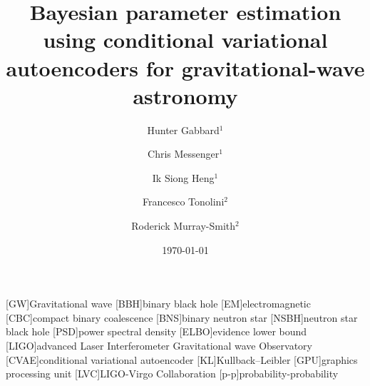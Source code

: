 \documentclass[%
showpacs,
 amsmath,amssymb,
 aps,
 twocolumn,
 prl,
 reprint,
floatfix,
]{revtex4-1}
\begin{document}

\title{Bayesian parameter estimation using conditional variational autoencoders
for gravitational-wave astronomy}

\author{Hunter Gabbard$^1$}
\author{Chris Messenger$^1$}
\author{Ik Siong Heng$^1$}
\author{Francesco Tonolini$^2$}
\author{Roderick Murray-Smith$^2$}


\date{\today}

\maketitle

%

[GW]{Gravitational wave}
[BBH]{binary black hole}
[EM]{electromagnetic}
[CBC]{compact binary coalescence}
[BNS]{binary neutron star}
[NSBH]{neutron star black hole}
[PSD]{power spectral density}
[ELBO]{evidence lower bound}
[LIGO]{advanced Laser Interferometer Gravitational wave Observatory}
[CVAE]{conditional variational autoencoder}
[KL]{Kullback--Leibler}
[GPU]{graphics processing unit}
[LVC]{LIGO-Virgo Collaboration}
[p-p]{probability-probability}
\end{document}
